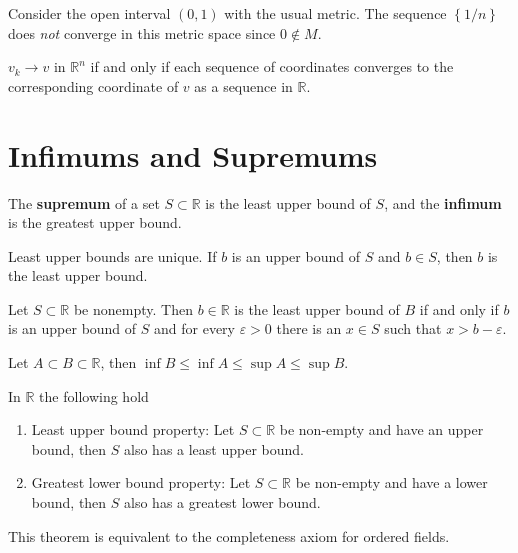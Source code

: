 \documentclass[twoside,10pt]{report}
\begin{document}
\begin{ex}[]
	Consider the open interval $(0,1)$ with the usual metric. The sequence $\left\{ 1/n \right\}$ does \textit{not} converge in this metric space since $0 \not\in M$.
\end{ex}

\begin{prop}
	$v_k \to v$ in $\mathbb{R}^n$ if and only if each sequence of coordinates converges to the corresponding coordinate of $v$ as a sequence in $\mathbb{R}$.
\end{prop}

\section{Infimums and Supremums}

\begin{defn}[]
	The \textbf{supremum} of a set $S \subset \mathbb{R}$ is the least upper bound of $S$, and the \textbf{infimum} is the greatest upper bound.
\end{defn}

Least upper bounds are unique. If $b$ is an upper bound of $S$ and $b \in S$, then $b$ is the least upper bound.

\begin{prop}
	Let $S \subset \mathbb{R}$ be nonempty. Then $b \in \mathbb{R}$ is the least upper bound of $B$ if and only if $b$ is an upper bound of $S$ and for every $\varepsilon > 0$ there is an $x \in S$ such that $x > b-\varepsilon$.
\end{prop}

\begin{prop}
	Let $A \subset B \subset \mathbb{R}$, then $\inf B \leq \inf A \leq \sup A \leq \sup B$.
\end{prop}

\begin{thrm}{}{}
	In $\mathbb{R}$ the following hold
	\begin{enumerate}
		\item Least upper bound property: Let $S \subset \mathbb{R}$ be non-empty and have an upper bound, then $S$ also has a least upper bound.
		\item Greatest lower bound property: Let $S \subset \mathbb{R}$ be non-empty and have a lower bound, then $S$ also has a greatest lower bound.
	\end{enumerate}
\end{thrm}
This theorem is equivalent to the completeness axiom for ordered fields.
\end{document}
